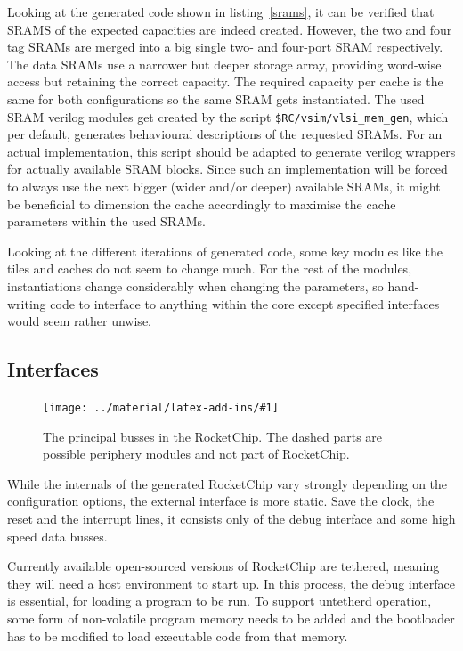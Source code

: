 \documentclass[journal,a4paper]{IEEEtran}
\newcommand*{\COMPILEIMAGES}{}%
\newcommand\inputimage[1]{%
	\ifdefined\COMPILEIMAGES
		
	\else
		\texttt{[image: ../material/latex-add-ins/\#1]}
	\fi
}
\begin{document}
Looking at the generated code shown in listing~\ref{srams}, it can be verified that SRAMS of the expected capacities are indeed created.
However, the two and four tag SRAMs are merged into a big single two- and four-port SRAM respectively.
The data SRAMs use a narrower but deeper storage array, providing word-wise access but retaining the correct capacity. The required capacity per cache is the same for both configurations so the same SRAM gets instantiated.
The used SRAM verilog modules get created by the script \texttt{\$RC/vsim/vlsi\_mem\_gen}, which per default, generates behavioural descriptions of the requested SRAMs.
For an actual implementation, this script should be adapted to generate verilog wrappers for actually available SRAM blocks.
Since such an implementation will be forced to always use the next bigger (wider and/or deeper) available SRAMs, it might be beneficial to dimension the cache accordingly to maximise the cache parameters within the used SRAMs.

Looking at the different iterations of generated code, some key modules like the tiles and caches do not seem to change much.
For the rest of the modules, instantiations change considerably when changing the parameters, so hand-writing code to interface to anything within the core except specified interfaces would seem rather unwise.

\subsection{Interfaces}

\begin{figure}%
	\centering
	\inputimage{image4}
	\caption{The principal busses in the RocketChip. The dashed parts are possible periphery modules and not part of RocketChip.}
	\label{busses}
\end{figure}
While the internals of the generated RocketChip vary strongly depending on the configuration options, the external interface is more static.
Save the clock, the reset and the interrupt lines, it consists only of the debug interface and some high speed data busses.

Currently available open-sourced versions of RocketChip are tethered\cite{tether}, meaning they will need a host environment to start up.
In this process, the debug interface is essential, for loading a program to be run.
To support untetherd operation, some form of non-volatile program memory needs to be added and the bootloader has to be modified to load executable code from that memory.
\end{document}
